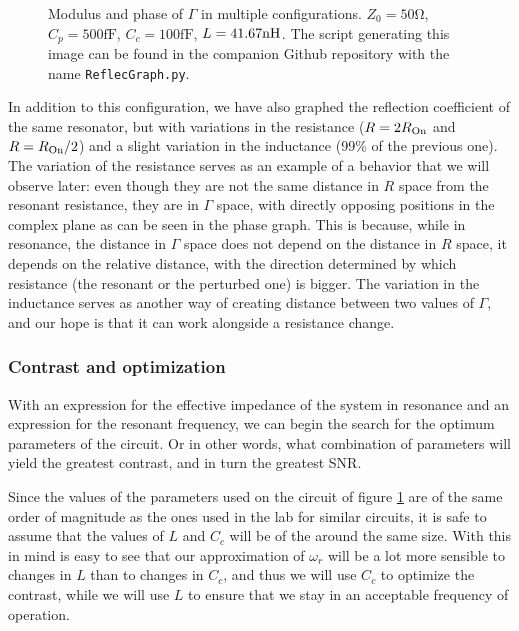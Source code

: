 \documentclass[../main.tex]{subfiles}
\begin{document}
\begin{figure}[t]
\centering
\begin{subfigure}[T]{.5\textwidth}
  \centering
  
\end{subfigure}%
\begin{subfigure}[T]{.5\textwidth}
  \centering
  
\end{subfigure}
\caption{Modulus and phase of \(\Gamma\) in multiple configurations.
\(Z_{0}=50\unit{\ohm}\), \(C_{p} = 500\unit{\fF}\), \(C_{c} = 100\unit{\fF}\),
\(L = 41.67\unit{\nH}\).
The script generating this image can be found in the
companion Github repository with the name \texttt{ReflecGraph.py}.}
\label{fig:ReflexCoeffAndPhase}
\end{figure}

In addition to this configuration, we have also graphed the reflection coefficient
of the same resonator, but with variations in the resistance (\(R = 2R_{\text{On}}\) and
\(R = R_{\text{On}}/2\)) and a slight variation in the inductance (99\% of the previous
one). The variation of the resistance serves as an example of a behavior that
we will observe later: even though they are not the same distance in \(R\)
space from the resonant resistance, they are in \(\Gamma\) space, with directly
opposing positions in the complex plane as can be seen in the phase graph.
This is because, while in resonance, the distance in \(\Gamma\) space does
not depend on the distance in \(R\) space, it depends on the relative
distance, with the direction determined by which resistance (the resonant or
the perturbed one) is bigger. The variation in the inductance serves as another
way of creating distance between two values of \(\Gamma\), and our hope
is that it can work alongside a resistance change.


\subsubsection{Contrast and optimization}
\label{subsubsec:OptParallel}
With an expression for the effective impedance of the system in resonance and
an expression for the resonant frequency, we can begin the search for the
optimum parameters of the circuit. Or in other words, what combination
of parameters will yield the greatest contrast, and in turn the
greatest SNR.

Since the values of the parameters used on the circuit of figure
\ref{fig:ReflexCoeffAndPhase} are of the same order of magnitude as
the ones used in the lab for similar circuits\cite{ibbersonDispersivereadout},
it is safe to assume that the values of \(L\) and \(C_{c}\) will be of the
around the same size. With this in mind is easy to see that our approximation of
\(\omega_{r}\)
will be a lot more sensible to changes in \(L\) than to changes in \(C_{c}\),
and thus we will use \(C_{c}\) to optimize the contrast, while we will use \(L\)
to ensure that we stay in an acceptable frequency of operation.
\end{document}
